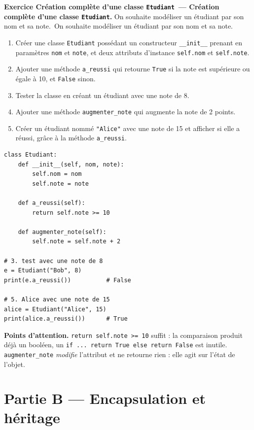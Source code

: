 \documentclass[11pt,a4paper]{article}
\newif\ifcorrige
\newcommand{\py}[1]{\texttt{#1}}
\newcounter{exo}[section]
\renewcommand{\theexo}{\arabic{exo}}
\newcommand{\exo}[2][]{%
  \Needspace{5cm}\stepcounter{exo}%
  \begin{quest}\textbf{Exercice \theexo\ifx\relax#1\relax\else\ — #1\fi.}
  \ifx\relax#2\relax\else\ #2\fi\end{quest}}
\newcommand{\zonecode}[1][4cm]{%
  \ifcorrige\else
    \par\smallskip\noindent
    \begin{tcolorbox}[colback=white,colframe=black!45,boxrule=0.5pt,arc=1pt,height=#1]\end{tcolorbox}%
  \fi}
\newenvironment{solution}
  {\ifcorrige
     \begin{tcolorbox}[enhanced,breakable,colback=corrbg,colframe=corr,boxrule=0.6pt,arc=1pt,
       left=5pt,right=5pt,top=4pt,bottom=4pt,
       title={Corrigé},coltitle=corr,fonttitle=\bfseries\small,detach title,
       before upper={\tcbtitle\par\smallskip},fontupper=\small]%
   \else
     \setbox0\vbox\bgroup
   \fi}
  {\ifcorrige\end{tcolorbox}\else\egroup\fi}
\begin{document}
\exo[Création complète d'une classe \py{Etudiant}]{On souhaite modéliser un étudiant par son
nom et sa note.}

\begin{enumerate}
  \item Créer une classe \py{Etudiant} possédant un constructeur \py{__init__} prenant en
    paramètres \py{nom} et \py{note}, et deux attributs d'instance \py{self.nom} et \py{self.note}.
  \item Ajouter une méthode \py{a_reussi} qui retourne \py{True} si la note est supérieure ou
    égale à 10, et \py{False} sinon.
  \item Tester la classe en créant un étudiant avec une note de 8.
  \item Ajouter une méthode \py{augmenter_note} qui augmente la note de 2 points.
  \item Créer un étudiant nommé \py{"Alice"} avec une note de 15 et afficher si elle a réussi,
    grâce à la méthode \py{a_reussi}.
\end{enumerate}
\zonecode[7cm]
\begin{solution}
\begin{lstlisting}
class Etudiant:
    def __init__(self, nom, note):
        self.nom = nom
        self.note = note

    def a_reussi(self):
        return self.note >= 10

    def augmenter_note(self):
        self.note = self.note + 2

# 3. test avec une note de 8
e = Etudiant("Bob", 8)
print(e.a_reussi())          # False

# 5. Alice avec une note de 15
alice = Etudiant("Alice", 15)
print(alice.a_reussi())      # True
\end{lstlisting}
\textbf{Points d'attention.}
\py{return self.note >= 10} suffit : la comparaison produit déjà un booléen, un
\py{if ... return True else return False} est inutile.
\py{augmenter_note} \emph{modifie} l'attribut et ne retourne rien : elle agit sur l'état de l'objet.
\end{solution}

\clearpage
\section*{Partie B --- Encapsulation et héritage}
\setcounter{exo}{0}
\end{document}
